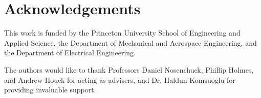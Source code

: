 \documentclass[11pt]{article}
\begin{document}
\section{Acknowledgements}

This work is funded by the Princeton University School of Engineering and Applied Science, the Department of Mechanical and Aerospace Engineering, and the Department of Electrical Engineering. 

The authors would like to thank Professors Daniel Nosenchuck, Phillip Holmes, and Andrew Houck for acting as advisers, and Dr. Haldun Komsuoglu for providing invaluable support.
\end{document}
